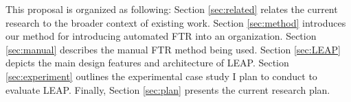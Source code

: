 This proposal is organized as following: Section \ref{sec:related} relates
the current research to the broader context of existing work.  Section
\ref{sec:method} introduces our method for introducing automated FTR into
an organization.  Section \ref{sec:manual} describes the manual FTR method
being used.  Section \ref{sec:LEAP} depicts the main design features and
architecture of LEAP.  Section \ref{sec:experiment} outlines the
experimental case study I plan to conduct to evaluate LEAP.  Finally,
Section \ref{sec:plan} presents the current research plan.

